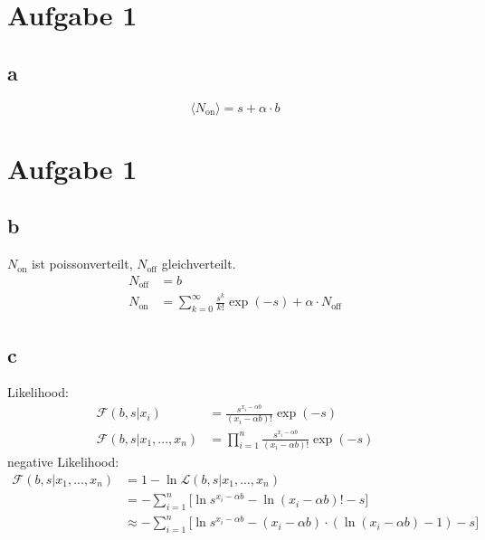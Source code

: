 \newpage\section*{Aufgabe 1}
\subsection*{a}
\begin{equation}
\langle N_\text{on}\rangle = s + \alpha \cdot b
\end{equation}
\newpage\section*{Aufgabe 1}
\subsection*{b}
$N_\text{on}$ ist poissonverteilt, $N_\text{off}$ gleichverteilt.
\begin{align}
N_\text{off}&= b\\
N_\text{on} &= \sum_{k=0}^{\infty} \frac{s^k}{k!}\exp(-s) + \alpha \cdot N_\text{off}
\end{align}
\subsection*{c}
Likelihood:
\begin{align}
\mathcal{F}(b,s|x_i) &=  \frac{s^{x_i-\alpha b}}{(x_i-\alpha b)!}\exp(-s)\\
\mathcal{F}(b,s|x_1,...,x_n) &= \prod\limits_{i=1}^{n} \frac{s^{x_i-\alpha b}}{(x_i-\alpha b)!}\exp(-s)
\end{align}
negative Likelihood:
\begin{align}
\mathcal{F}(b,s|x_1,...,x_n) &=  1- \ln \mathcal{L}(b,s|x_1,...,x_n) \\
&= - \sum\limits_{i=1}^{n} \biggl[\ln{s^{x_i-\alpha b}}-\ln{(x_i-\alpha b)!} - s\biggr]\\
&\approx - \sum\limits_{i=1}^{n} \biggl[\ln{s^{x_i-\alpha b}}- (x_i-\alpha b)\cdot(\ln(x_i-\alpha b)-1) - s\biggr]  %
\end{align}
